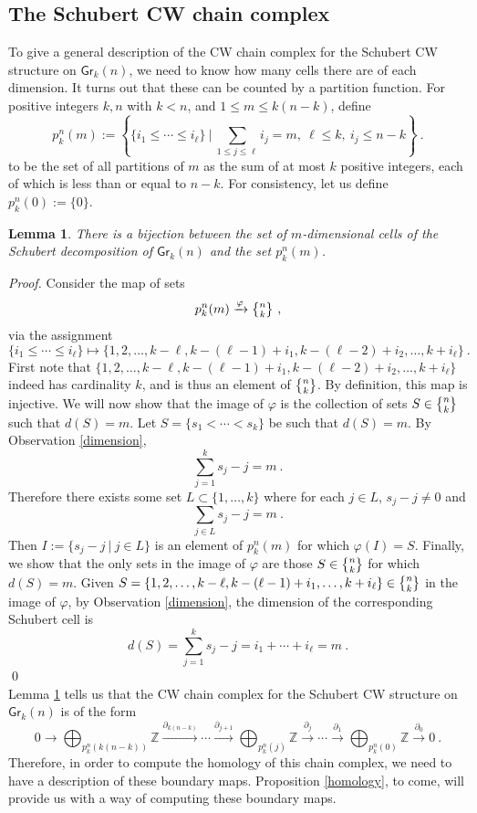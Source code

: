 \documentclass{article}
\newcommand{\bb}[1]{\mathbb{#1}}
\newcommand{\msf}[1]{\mathsf{#1}}
\newcommand{\gr}{\msf{Gr}}
\newcommand{\nchoosek}{\textstyle\genfrac{\lbrace}{\rbrace}{0pt}{}}
\newtheorem{lemma}[theorem]{Lemma}
\theoremstyle{definition}
\begin{document}
\subsection{The Schubert CW chain complex}
To give a general description of the CW chain complex for the Schubert CW structure on $\gr_k(n)$, 
we need to know how many cells there are of each
dimension. It turns out that these can be counted by a partition function. For positive integers $k,n$ with $k < n$, 
and $1 \le m \le k(n-k)$, define 
$$p_k^n(m) := \left\{\{i_1 \le \cdots \le i_\ell\} ~|~ \sum_{1 \le j \le \ell} i_j = m, ~ \ell\le k, ~ i_j \le n-k\right\}~.$$
to be the set of all partitions of $m$ as the sum of at most $k$ positive
integers, each of which is less than or equal to $n-k$. For consistency, let us define $p_k^n(0) := \{0\}$.
\begin{lemma}\label{numOCells}
    There is a bijection between the set of $m$-dimensional cells of the Schubert decomposition of $\gr_k(n)$ 
    and the set $p_k^n(m)$.
\end{lemma}
{\it Proof.} Consider the map of sets
$$p_k^n(m) \xrightarrow{\varphi} \nchoosek{n}{k}~,$$ 
via the assignment
$$\{i_1 \le \cdots \le i_\ell\} \mapsto \{1,2,\dots,k-\ell,k-(\ell-1)+i_1, k-(\ell-2)+i_2, \dots, k+i_\ell\}~.$$
First note that $\{1,2,\dots,k-\ell,k-(\ell-1)+i_1, k-(\ell-2)+i_2, \dots, k+i_\ell\}$ indeed has cardinality $k$, and is thus
an element of $\nchoosek{n}{k}$. By definition, this map is injective. We will now show that the image of $\varphi$
is the collection of sets $S \in \nchoosek{n}{k}$ such that $d(S) = m$.
Let $S=\{s_1< \cdots< s_k\}$ be such that $d(S) = m$. By Observation \ref{dimension},
$$\sum_{j=1}^k s_j-j = m~.$$
Therefore there exists some set $L\subset \{1,\dots,k\}$ where for each $j\in L$, $s_j-j\neq 0$ and 
$$\sum_{j\in L}s_j-j = m~.$$ 
Then $I:=\{s_j-j ~|~ j\in L\}$ is an element of $p^n_k(m)$ for which $\varphi(I)=S$.
Finally, we show that the only sets in the image of $\varphi$ are those $S \in \nchoosek{n}{k}$ for which $d(S)=m$.
Given $S=\{1,2,\dots, k-\ell,k-(\ell-1)+i_1,\dots,k+i_\ell\} \in \nchoosek{n}{k}$ in the image of 
$\varphi$, by Observation \ref{dimension}, the dimension of the corresponding Schubert cell is 
$$d(S) = \sum_{j=1}^k s_j-j = i_1+\cdots +i_\ell = m~.$$
\qed \\

Lemma \ref{numOCells}
tells us that the CW chain complex for the Schubert CW structure on $\gr_k(n)$ is of the form
$$0 \to \bigoplus_{p^n_k(k(n-k))} \bb{Z} \xrightarrow{\partial_{k(n-k)}} \cdots 
    \xrightarrow{\partial_{j+1}} 
    \bigoplus_{p^n_k(j)} \bb{Z} \xrightarrow{\partial_j} \cdots \xrightarrow{\partial_1} 
    \bigoplus_{p^n_k(0)} \bb{Z}
    \xrightarrow{\partial_0} 0~.$$
Therefore, in order to compute the homology of this chain complex, we need to have a description of these
boundary maps. Proposition \ref{homology}, to come, will provide us with a way of computing these
boundary maps.
\end{document}
